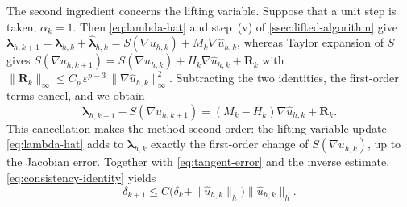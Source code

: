 \documentclass[11pt,pdflatex,sn-mathphys-num]{sn-jnl}
\theoremstyle{thmstyleone}%
\theoremstyle{thmstyletwo}%
\theoremstyle{thmstylethree}%
\newcommand{\bs}[1]{\ensuremath{\boldsymbol{#1}}}
\begin{document}
The second ingredient concerns the lifting variable. Suppose that a unit step is taken, $\alpha_k=1$. Then \eqref{eq:lambda-hat} and step~(v) of \cref{ssec:lifted-algorithm} give
$\bs\lambda_{h,k+1}=\bs\lambda_{h,k}+\hat{\bs\lambda}_{h,k}=S(\nabla u_{h,k})+M_k\nabla\hat u_{h,k}$, whereas Taylor expansion of $S$ gives
$S(\nabla u_{h,k+1})=S(\nabla u_{h,k})+H_k\nabla\hat u_{h,k}+\bs R_k$ with $\|\bs R_k\|_\infty\le C_p\,\varepsilon^{p-3}\,\|\nabla\hat u_{h,k}\|_\infty^2$. Subtracting the two identities, the first-order terms cancel, and we obtain
\begin{equation}\label{eq:consistency-identity}
  \bs\lambda_{h,k+1}-S(\nabla u_{h,k+1})
  =(M_k-H_k)\nabla\hat u_{h,k}+\bs R_k .
\end{equation}
This cancellation makes the method second order: the lifting variable update \eqref{eq:lambda-hat} adds to $\bs\lambda_{h,k}$ exactly the first-order change of $S(\nabla u_{h,k})$, up to the Jacobian error. Together with \eqref{eq:tangent-error} and the inverse estimate, \eqref{eq:consistency-identity} yields
\begin{equation}\label{eq:delta-recursion}
  \delta_{k+1}\le C\bigl(\delta_k+\|\hat u_{h,k}\|_h\bigr)\|\hat u_{h,k}\|_h .
\end{equation}
\end{document}
